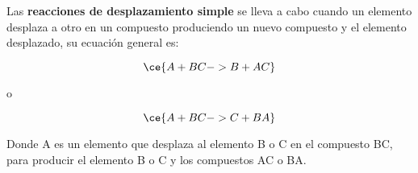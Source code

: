 \begin{warncard}[adjusted title={Reacción de desplazamiento simple}]
    Las \textbf{reacciones de desplazamiento simple} se lleva a cabo cuando un elemento desplaza a otro en un compuesto produciendo un nuevo compuesto y el elemento desplazado, su ecuación general es:

    \[\ce{A + BC -> B + AC}\]

    o

    \[\ce{A + BC -> C + BA}\]

    Donde A es un elemento que desplaza al elemento B o C en el compuesto BC, para producir el elemento B o C y los compuestos AC o BA.
\end{warncard}